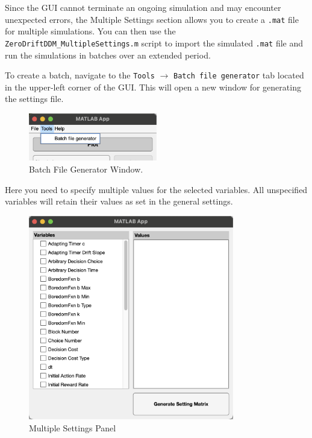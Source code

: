 Since the GUI cannot terminate an ongoing simulation and may encounter unexpected errors, the Multiple Settings section allows you to create a \texttt{.mat} file for multiple simulations. You can then use the \texttt{ZeroDriftDDM\_MultipleSettings.m} script to import the simulated \texttt{.mat} file and run the simulations in batches over an extended period.



To create a batch, navigate to the \texttt{Tools} $\rightarrow$ \texttt{Batch file generator} tab located in the upper-left corner of the GUI. This will open a new window for generating the settings file.

\begin{figure}[H]
    \centering
    \includegraphics[width=0.5\textwidth]{figs/batch_generator.png}
    \caption{Batch File Generator Window.}
    \label{fig:batch_generator}
\end{figure}

Here you need to specify multiple values for the selected variables. All unspecified variables will retain their values as set in the general settings.

\begin{figure}[H]
    \centering
    \includegraphics[width=0.8\textwidth]{figs/multiple_settings.png}
    \caption{Multiple Settings Panel}
    \label{fig:multiple_settings}
\end{figure}

